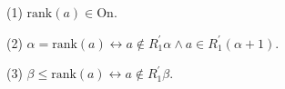 (1) $\text{rank}(a) \in \text{On}$.

(2) $\alpha = \text{rank}(a) \leftrightarrow a \notin R_{1}^{\prime}\alpha \wedge a \in R_{1}^{\prime}(\alpha + 1)$.

(3) $\beta \le \text{rank}(a) \leftrightarrow a \notin R_{1}^{\prime}\beta$.
